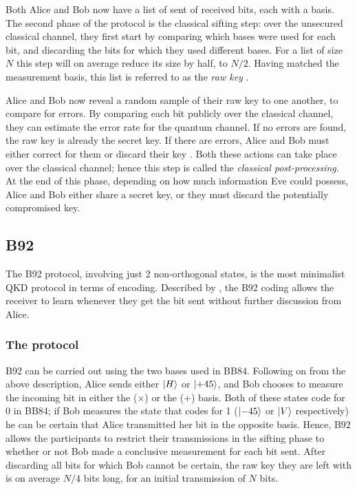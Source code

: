\documentclass[paper=a4, fontsize=11pt]{scrartcl} %
\numberwithin{equation}{section} %
\numberwithin{figure}{section} %
\numberwithin{table}{section} %
\begin{document}
Both Alice and Bob now have a list of sent of received bits, each with a basis. The second
phase of the protocol is the classical sifting step: over the unsecured classical channel, they
first start by comparing which bases were used for each bit, and discarding the bits for which
they used different bases. For a list of size $N$ this step will on average reduce its size by half,
to $N/2$. Having matched the measurement basis, this list is referred to as the \textit{raw key} \citep{gisin2002}.

Alice and Bob now reveal a random sample of their raw key to one another, to compare for errors. By
comparing each bit publicly over the classical channel, they can estimate the error rate for
the quantum channel. If no errors are found, the raw key is already the secret key. If there are
errors, Alice and Bob must either correct for them or discard their key \citep{reviewScariani}. Both these actions can
take place over the classical channel; hence this step is called the \textit{classical post-processing}.
At the end of this phase, depending on how much information Eve could possess, Alice and Bob either share
a secret key, or they must discard the potentially compromised key.

\subsection{B92}
The B92 protocol, involving just 2 non-orthogonal states, is the
most minimalist QKD protocol in terms of encoding. Described by \citet{B92},
the B92 coding allows the receiver to learn whenever they get
the bit sent without further discussion from Alice.

\subsubsection{The protocol}
B92 can be carried out using the two bases used in BB84. Following on from the above description, Alice sends either
$\ket{H}$ or $\ket{+45}$, and Bob chooses to measure the incoming bit in either the ($\times$) or the ($+$)
basis. Both of these states code for 0 in BB84; if Bob measures the state that codes for 1 ($\ket{-45}$ or
$\ket{V}$ respectively) he can be certain that Alice transmitted her bit in the opposite basis. Hence, B92
allows the participants to restrict their transmissions in the sifting phase to whether or not Bob made
a conclusive measurement for each bit sent. After discarding all bits for which Bob cannot be certain, the raw
key they are left with is on average $N/4$ bits long, for an initial transmission of $N$ bits.
\end{document}
